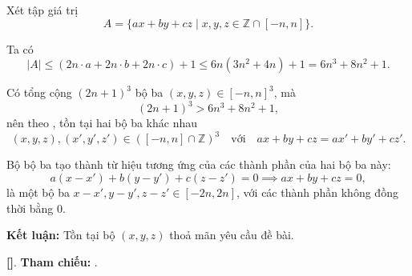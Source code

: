 \documentclass[../2015-n-s.tex]{subfiles}
\begin{document}
\begin{soln}

	Xét tập giá trị
	\[
		A = \{ ax + by + cz \mid x, y, z \in \mathbb{Z} \cap [-n, n] \}.
	\]

	Ta có
	\[
		|A| \leq (2n \cdot a + 2n \cdot b + 2n \cdot c) + 1 \le 6n(3n^2 + 4n) + 1 = 6n^3 + 8n^2 + 1.
	\]

	Có tổng cộng \( (2n + 1)^3 \) bộ ba \( (x, y, z) \in [-n, n]^3 \), mà
	\[
		(2n+1)^3 > 6n^3 + 8n^2 + 1,
	\]
	nên theo , tồn tại hai bộ ba khác nhau
	\[
		(x, y, z), (x', y', z') \in ([-n, n] \cap \mathbb{Z})^3 \quad \text{với} \quad ax + by + cz = ax' + by' + cz'.
	\]

	Bộ bộ ba tạo thành từ hiệu tương ứng của các thành phần của hai bộ ba này:
	\[
		a(x - x') + b(y - y') + c(z - z') = 0 \implies ax + by + cz = 0,
	\]
	là một bộ ba \( x - x', y - y', z - z' \in [-2n, 2n] \), với các thành phần không đồng thời bằng 0.

	\textbf{Kết luận:} Tồn tại bộ \( (x, y, z) \) thoả mãn yêu cầu đề bài.

	\vspace{1em}
	\textbf{[]}.
	\textbf{Tham chiếu:} .
\end{soln}

\end{document}
